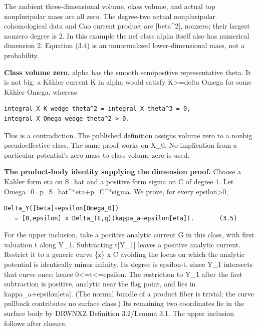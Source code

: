 \documentclass[11pt]{article}
\begin{document}
The ambient three-\allowbreak{}dimensional volume, class volume, and actual top nonpluripolar mass are all zero. The degree-\allowbreak{}two actual nonpluripolar cohomological data and Cao current product are [beta\textasciicircum{}\allowbreak{}2], nonzero; their largest nonzero degree is 2. In this example the nef class alpha itself also has numerical dimension 2. Equation (3.4) is an unnormalized lower-\allowbreak{}dimensional mass, not a probability.

\textbf{Class volume zero.} alpha has the smooth semipositive representative theta. It is not big: a Kähler current K in alpha would satisfy K>=\allowbreak{}delta Omega for some Kähler Omega, whereas

\begin{Verbatim}[breaklines=true,fontsize=\small]
integral_X K wedge theta^2 = integral_X theta^3 = 0,
integral_X Omega wedge theta^2 > 0.
\end{Verbatim}

This is a contradiction. The published definition assigns volume zero to a nonbig pseudoeffective class. The same proof works on X\_\allowbreak{}0. No implication from a particular potential's zero mass to class volume zero is used.

\textbf{The product-\allowbreak{}body identity supplying the dimension proof.} Choose a Kähler form eta on S\_\allowbreak{}hat and a positive form sigma on C of degree 1. Let Omega\_\allowbreak{}0=\allowbreak{}p\_\allowbreak{}S\_\allowbreak{}hat\textasciicircum{}\allowbreak{}*eta+p\_\allowbreak{}C\textasciicircum{}\allowbreak{}*sigma. We prove, for every epsilon>0,

\begin{Verbatim}[breaklines=true,fontsize=\small]
Delta_Y([beta]+epsilon[Omega_0])
   = [0,epsilon] x Delta_(E,q)(kappa_a+epsilon[eta]).       (3.5)
\end{Verbatim}

For the upper inclusion, take a positive analytic current G in this class, with first valuation t along Y\_\allowbreak{}1. Subtracting t[Y\_\allowbreak{}1] leaves a positive analytic current. Restrict it to a generic curve \{z\} x C avoiding the locus on which the analytic potential is identically minus infinity. Its degree is epsilon-\allowbreak{}t, since Y\_\allowbreak{}1 intersects that curve once; hence 0<=\allowbreak{}t<=\allowbreak{}epsilon. The restriction to Y\_\allowbreak{}1 after the first subtraction is positive, analytic near the flag point, and lies in kappa\_\allowbreak{}a+epsilon[eta]. (The normal bundle of a product fiber is trivial; the curve pullback contributes no surface class.) Its remaining two coordinates lie in the surface body by DRWNXZ Definition 3.2/\allowbreak{}Lemma 3.1. The upper inclusion follows after closure.
\end{document}
